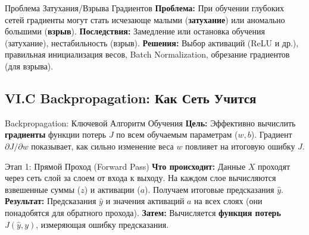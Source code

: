 \begin{alerttextbox}{Проблема Затухания/Взрыва Градиентов}
    \textbf{Проблема:} При обучении глубоких сетей градиенты могут стать исчезающе малыми (\textbf{затухание}) или аномально большими (\textbf{взрыв}).
    \textbf{Последствия:} Замедление или остановка обучения (затухание), нестабильность (взрыв).
    \textbf{Решения:} Выбор активаций (ReLU и др.), правильная инициализация весов, Batch Normalization, обрезание градиентов (для взрыва).
\end{alerttextbox}

\subsection{VI.C Backpropagation: Как Сеть Учится}

\begin{alerttextbox}{Backpropagation: Ключевой Алгоритм Обучения}
    \textbf{Цель:} Эффективно вычислить \textbf{градиенты} функции потерь $J$ по всем обучаемым параметрам ($w, b$). Градиент $\partial J / \partial w$ показывает, как сильно изменение веса $w$ повлияет на итоговую ошибку $J$.
\end{alerttextbox}

\begin{myblock}{Этап 1: Прямой Проход (Forward Pass)}
    \textbf{Что происходит:} Данные $X$ проходят через сеть слой за слоем от входа к выходу. На каждом слое вычисляются взвешенные суммы ($z$) и активации ($a$). Получаем итоговые предсказания $\hat{y}$.
    \textbf{Результат:} Предсказания $\hat{y}$ и значения активаций $a$ на всех слоях (они понадобятся для обратного прохода).
    \textbf{Затем:} Вычисляется \textbf{функция потерь} $J(\hat{y}, y)$, измеряющая ошибку предсказания.
\end{myblock}

